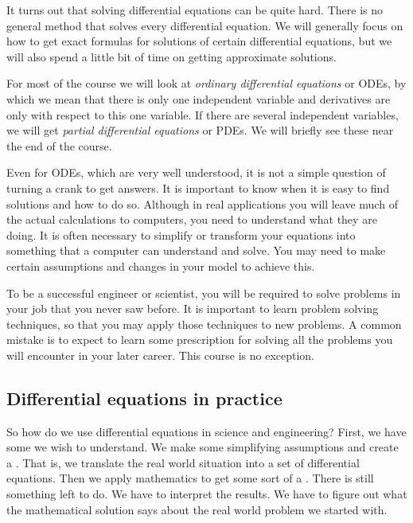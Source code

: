 \medskip

It turns out that solving differential equations can be quite hard.  
There is no general method that solves every differential equation.  We will
generally focus on how to get exact formulas for solutions of certain
differential
equations, but we will also spend a little bit of time
on getting approximate solutions.

For most of the course we will look at
\emph{ordinary differential equations} or ODEs, by which we mean that there
is only one independent variable and derivatives are only with respect to
this one variable.
If there are several independent variables, we will get
\emph{partial differential equations}
or PDEs.
We will briefly see these near the
end of the course.

Even for ODEs, which are very well understood, it is not a simple question
of turning a crank to get answers.  
It is important to
know when it is easy to find solutions and how to do so.
Although in real applications you will
leave much of the actual calculations to computers, you
need to understand what they are doing.  It is often necessary
to simplify or transform your equations into something that a computer can
understand and solve.
You may need to make certain assumptions and changes in your
model to achieve this.

To be a successful engineer or scientist, you will be required to solve
problems in your job that you never saw before.  It is important to
learn problem solving techniques, so that you may apply those techniques to
new problems.  A common mistake is to expect to learn some prescription for
solving all the problems you will encounter in your later career.  This
course is no exception.


\subsection{Differential equations in practice}

\begin{diffyfloatingfiguresimpler}{3.05in}{3.35in}
\noindent
{}
\end{diffyfloatingfiguresimpler}
So how do we use differential equations in science and engineering?  
First, we have some \emph{} we wish
to understand.
We make some simplifying assumptions and create a \emph{}.
That is, we translate the real world situation into a
set of differential equations.
Then we apply mathematics to get some sort of a \emph{}.
There is still something left to do.  We have to interpret the results.
We have to figure out what the mathematical solution says about the real world
problem we started with.

